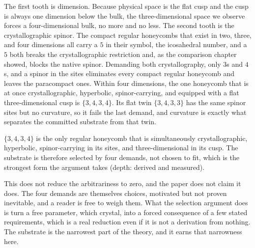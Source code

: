 The first tooth is dimension. Because physical space is the flat cusp and the cusp is always one dimension below the bulk, the three-dimensional space we observe forces a four-dimensional bulk, no more and no less. The second tooth is the crystallographic spinor. The compact regular honeycombs that exist in two, three, and four dimensions all carry a $5$ in their symbol, the icosahedral number, and a $5$ both breaks the crystallographic restriction and, as the comparison chapter showed, blocks the native spinor. Demanding both crystallography, only $3$s and $4$s, and a spinor in the sites eliminates every compact regular honeycomb and leaves the paracompact ones. Within four dimensions, the one honeycomb that is at once crystallographic, hyperbolic, spinor-carrying, and equipped with a flat three-dimensional cusp is $\{3,4,3,4\}$. Its flat twin $\{3,4,3,3\}$ has the same spinor sites but no curvature, so it fails the last demand, and curvature is exactly what separates the committed substrate from that twin.

\begin{result}
$\{3,4,3,4\}$ is the only regular honeycomb that is simultaneously crystallographic, hyperbolic, spinor-carrying in its sites, and three-dimensional in its cusp. The substrate is therefore selected by four demands, not chosen to fit, which is the strongest form the argument takes (depth: derived and measured).
\end{result}

This does not reduce the arbitrariness to zero, and the paper does not claim it does. The four demands are themselves choices, motivated but not proven inevitable, and a reader is free to weigh them. What the selection argument does is turn a free parameter, which crystal, into a forced consequence of a few stated requirements, which is a real reduction even if it is not a derivation from nothing. The substrate is the narrowest part of the theory, and it earns that narrowness here.
